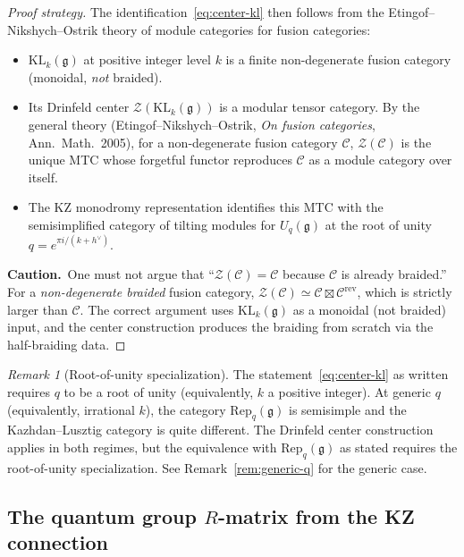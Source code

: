 \documentclass[11pt]{article}
\theoremstyle{definition}
\theoremstyle{remark}
\newtheorem{remark}[theorem]{Remark}
\newcommand{\Rep}{\mathrm{Rep}}
\newcommand{\Uq}{U_q}
\newcommand{\cC}{\mathcal{C}}
\newcommand{\cZ}{\mathcal{Z}}
\newcommand{\frakg}{\mathfrak{g}}
\newcommand{\KL}{\mathrm{KL}}
\begin{document}
\begin{proof}[Proof strategy]
The identification~\eqref{eq:center-kl} then follows from the
Etingof--Nikshych--Ostrik theory of module categories for fusion categories:
\begin{itemize}
 \item $\KL_k(\frakg)$ at positive integer level $k$ is a finite
 non-degenerate fusion category (monoidal, \emph{not} braided).
 \item Its Drinfeld center $\cZ(\KL_k(\frakg))$ is a modular tensor
 category. By the general theory (Etingof--Nikshych--Ostrik,
 \emph{On fusion categories}, Ann.\ Math.\ 2005), for a
 non-degenerate fusion category $\cC$, $\cZ(\cC)$ is the unique MTC
 whose forgetful functor reproduces $\cC$ as a module category over itself.
 \item The KZ monodromy representation identifies this MTC with the
 semisimplified category of tilting modules for $\Uq(\frakg)$ at the
 root of unity $q = e^{\pi i / (k + h^\vee)}$.
\end{itemize}
\textbf{Caution.}\ One must not argue that ``$\cZ(\cC) = \cC$ because $\cC$ is
already braided.'' For a \emph{non-degenerate braided} fusion category, $\cZ(\cC) \simeq \cC \boxtimes \cC^{\mathrm{rev}}$, which is strictly larger than $\cC$. The correct argument uses $\KL_k(\frakg)$ as a monoidal (not braided) input, and the center construction produces the braiding from scratch via the half-braiding data.
\end{proof}

\begin{remark}[Root-of-unity specialization]
\label{rem:root-of-unity}
The statement~\eqref{eq:center-kl} as written requires $q$ to be a root of unity (equivalently, $k$ a positive integer). At generic $q$ (equivalently, irrational $k$), the category $\Rep_q(\frakg)$ is semisimple and the Kazhdan--Lusztig category is quite different. The Drinfeld center construction applies in both regimes, but the equivalence with $\Rep_q(\frakg)$ as stated requires the root-of-unity specialization. See Remark~\ref{rem:generic-q} for the generic case.
\end{remark}


\subsection{The quantum group $R$-matrix from the KZ connection}
\end{document}
